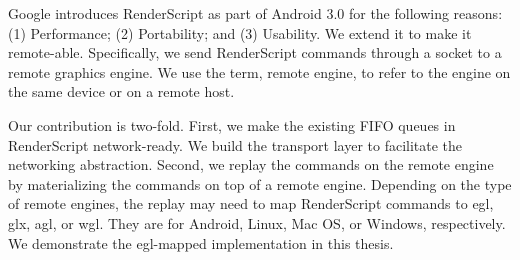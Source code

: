 \begin{abstractEN}

Google introduces RenderScript as part of Android 3.0 for the following reasons: (1) Performance;  (2) Portability; and (3) Usability. We extend it to make it remote-able. Specifically, we send RenderScript commands through a socket to a remote graphics engine. We use the term, remote engine, to refer to the engine on the same device or on a remote host. 

Our contribution is two-fold. First, we make the existing FIFO queues in RenderScript network-ready. We build the transport layer to facilitate the networking abstraction. Second, we replay the commands on the remote engine by materializing the commands on top of a remote engine. Depending on the type of remote engines, the replay may need to map RenderScript commands to egl, glx, agl, or wgl. They are for Android, Linux, Mac OS, or Windows, respectively. We demonstrate the egl-mapped implementation in this thesis.

\end{abstractEN}

\begin{comment}

\category{D2.4}{Software}{Software Engineering --
Software/Program Verification} 
\category{D2.5}{Software}{Software Engineering -- 
Testing and Debugging}
\category{F3.1}{Theory of Computation}{Logics and Meanings of Programs -- 
Specifying and Verifying and Reasoning about Programs.}

\terms{Algorithms, Design, Verification.}

\keywords{OpenMP, GCC, LLVM, data race, multithread, dynamic analysis, static analysis.}

\end{comment}
